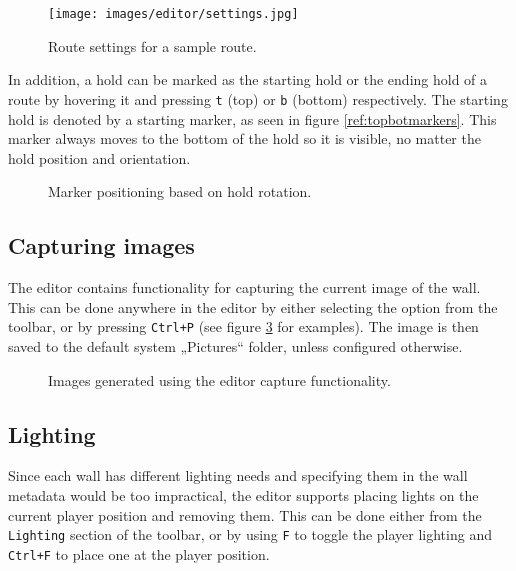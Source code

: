 \begin{figure}[h]
	\centering
	\texttt{[image: images/editor/settings.jpg]}
	\caption{Route settings for a sample route.}%
	\label{fig:routesettings}
\end{figure}

In addition, a hold can be marked as the starting hold or the ending hold of a route by hovering it and pressing \verb|t| (top) or \verb|b| (bottom) respectively.
The starting hold is denoted by a starting marker, as seen in figure \ref{ref:topbotmarkers}.
This marker always moves to the bottom of the hold so it is visible, no matter the hold position and orientation.

\begin{figure}[h]
	\centering
	\hfill
	\hfill
	\hfill
	\caption{Marker positioning based on hold rotation.}%
	\label{fig:topbotmarkers}
\end{figure}

\subsection{Capturing images}
The editor contains functionality for capturing the current image of the wall.
This can be done anywhere in the editor by either selecting the option from the toolbar, or by pressing \verb|Ctrl+P| (see figure \ref{fig:capture} for examples).
The image is then saved to the default system „Pictures“ folder, unless configured otherwise.

\begin{figure}[h]
	\centering
	\hfill
	\caption{Images generated using the editor capture functionality.}%
	\label{fig:capture}
\end{figure}

\subsection{Lighting}
Since each wall has different lighting needs and specifying them in the wall metadata would be too impractical, the editor supports placing lights on the current player position and removing them.
This can be done either from the \verb|Lighting| section of the toolbar, or by using \verb|F| to toggle the player lighting and \verb|Ctrl+F| to place one at the player position.

